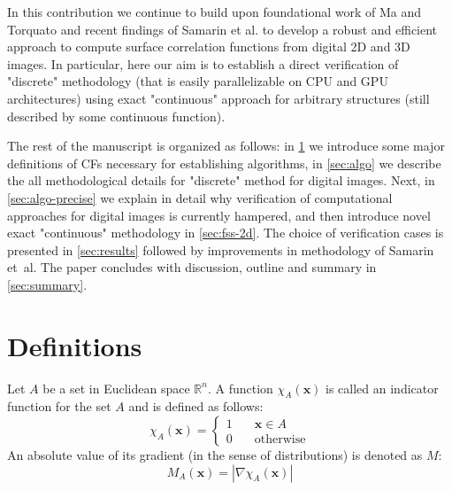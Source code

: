 \documentclass[preprint]{elsarticle}
\begin{document}
In this contribution we continue to build upon foundational work of Ma and
Torquato \cite{ma2018SS} and recent findings of Samarin et al. \cite{Samarin} to
develop a robust and efficient approach to compute surface correlation functions
from digital 2D and 3D images. In particular, here our aim is to establish a
direct verification of "discrete" methodology (that is easily parallelizable on
CPU and GPU architectures) using exact "continuous" approach for arbitrary
structures (still described by some continuous function).

The rest of the manuscript is organized as follows: in \cref{sec:def} we
introduce some major definitions of CFs necessary for establishing algorithms,
in \cref{sec:algo} we describe the all methodological details for "discrete"
method for digital images. Next, in \cref{sec:algo-precise} we explain in detail
why verification of computational approaches for digital images is currently
hampered, and then introduce novel exact "continuous" methodology in
\cref{sec:fss-2d}. The choice of verification cases is presented in
\cref{sec:results} followed by improvements in methodology of Samarin et~al. The
paper concludes with discussion, outline and summary in \cref{sec:summary}.

\section{Definitions}
\label{sec:def}
Let $A$ be a set in Euclidean space $\mathbb{R}^n$. A function
$\chi_A(\mathbf{x})$ is called an indicator function for the set $A$ and is
defined as follows:
\begin{equation}
  \chi_A(\bm{x}) = \left\{
  \begin{array}{ll}
    1 & \quad \bm{x} \in A \\
    0 & \quad \text{otherwise}
  \end{array}
  \right.
\end{equation}
An absolute value of its gradient (in the sense of distributions) is denoted
as $M$:
\begin{equation}
  M_A(\bm{x}) = |\nabla \chi_A(\bm{x})|
\end{equation}
\end{document}
